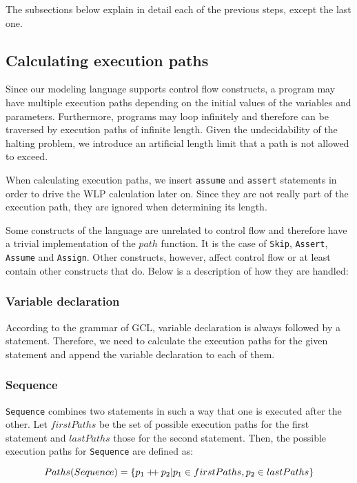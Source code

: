\documentclass[a4paper]{article}
\newcommand\mdoubleplus{\ensuremath{\mathbin{+\mkern-5mu+}}}
\begin{document}
The subsections below explain in detail each of the previous steps, except the last
one.

\subsection{Calculating execution paths}

Since our modeling language supports control flow constructs, a program may have
multiple execution paths depending on the initial values of the variables and
parameters. Furthermore, programs may loop infinitely and therefore can be traversed
by execution paths of infinite length. Given the undecidability of the halting
problem, we introduce an artificial length limit that a path is not allowed to exceed.

When calculating execution paths, we insert \texttt{assume} and \texttt{assert}
statements in order to drive the WLP calculation later on. Since they are not
really part of the execution path, they are ignored when determining its length.

Some constructs of the language are unrelated to control flow and therefore have
a trivial implementation of the $path$ function. It is the case of \texttt{Skip},
\texttt{Assert}, \texttt{Assume} and \texttt{Assign}. Other constructs, however,
affect control flow or at least contain other constructs that do. Below is a
description of how they are handled:

\subsubsection*{Variable declaration}

According to the grammar of GCL, variable declaration is always followed by a
statement. Therefore, we need to calculate the execution paths for the given
statement and append the variable declaration to each of them.

\subsubsection*{Sequence}

\texttt{Sequence} combines two statements in such a way that one is executed
after the other. Let $firstPaths$ be the set of possible execution paths for
the first statement and $lastPaths$ those for the second statement. Then, the
possible execution paths for \texttt{Sequence} are defined as:

\[ Paths(Sequence) = \{ p_1 \mdoubleplus p_2 | p_1 \in firstPaths, p_2 \in lastPaths\} \]
\end{document}

